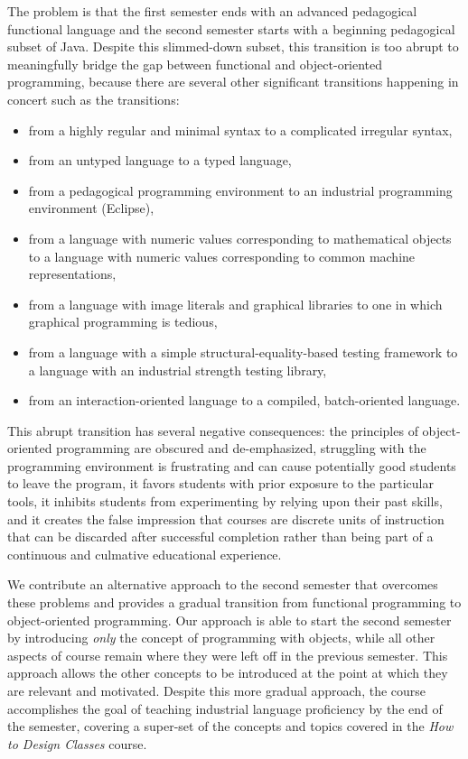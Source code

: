 \documentclass[submission,copyright]{eptcs}
\begin{document}
The problem is that the first semester ends with an advanced
pedagogical functional language and the second semester starts with a
beginning pedagogical subset of Java.  Despite this slimmed-down
subset, this transition is too abrupt to meaningfully bridge the gap
between functional and object-oriented programming, because there are
several other significant transitions happening in concert such as the
transitions:
\begin{itemize}
\item from a highly regular and minimal syntax to a complicated
  irregular syntax,

\item from an untyped language to a typed language,

\item from a pedagogical programming environment to an industrial
programming environment (Eclipse),

\item from a language with numeric values corresponding to
  mathematical objects to a language with numeric values corresponding
  to common machine representations,

\item from a language with image literals and graphical libraries to
  one in which graphical programming is tedious,
  
\item from a language with a simple structural-equality-based testing
  framework to a language with an industrial strength testing library,

\item from an interaction-oriented language to a compiled,
  batch-oriented language.  
\end{itemize}

This abrupt transition has several negative consequences: the
principles of object-oriented programming are obscured and
de-emphasized, struggling with the programming environment is
frustrating and can cause potentially good students to leave the
program, it favors students with prior exposure to the particular
tools, it inhibits students from experimenting by relying upon their
past skills, and it creates the false impression that courses are
discrete units of instruction that can be discarded after successful
completion rather than being part of a continuous and culmative
educational experience.


We contribute an alternative approach to the second semester that
overcomes these problems and provides a gradual transition from
functional programming to object-oriented programming.  Our approach
is able to start the second semester by introducing \emph{only} the
concept of programming with objects, while all other aspects of course
remain where they were left off in the previous semester.  This
approach allows the other concepts to be introduced at the point at
which they are relevant and motivated.  Despite this more gradual
approach, the course accomplishes the goal of teaching industrial
language proficiency by the end of the semester, covering a super-set
of the concepts and topics covered in the \emph{How to Design Classes}
course.
\end{document}
